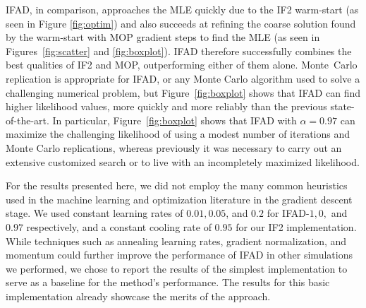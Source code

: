 \documentclass[9pt,twocolumn,pnasresearcharticle]{pnas-new}
\begin{document}
IFAD, in comparison, approaches the MLE quickly due to the IF2 warm-start (as seen in Figure \ref{fig:optim}) and also succeeds at refining the coarse solution found by the warm-start with MOP gradient steps to find the MLE (as seen in Figures~\ref{fig:scatter} and \ref{fig:boxplot}). IFAD therefore successfully combines the best qualities of IF2 and MOP, outperforming either of them alone.
Monte~Carlo replication is appropriate for IFAD, or any Monte Carlo algorithm used to solve a challenging numerical problem, but Figure~\ref{fig:boxplot} shows that IFAD can find higher likelihood values, more quickly and more reliably than the previous state-of-the-art. 
In particular, Figure~\ref{fig:boxplot} shows that IFAD with $\alpha=0.97$ can maximize the challenging likelihood of \cite{king08} using a modest number of iterations and Monte Carlo replications, whereas previously it was necessary to carry out an extensive customized search or to live with an incompletely maximized likelihood.

For the results presented here, we did not employ the many common heuristics used in the machine learning and optimization literature in the gradient descent stage.
We used constant learning rates of $0.01, 0.05$, and $0.2$ for IFAD-$1,0,$ and $0.97$ respectively, and a constant cooling rate of $0.95$ for our IF2 implementation.
While techniques such as annealing learning rates, gradient normalization, and momentum could further improve the performance of IFAD in other simulations we performed, we chose to report the results of the simplest implementation to serve as a baseline for the method's performance.
The results for this basic implementation already showcase the merits of the approach.
\end{document}
